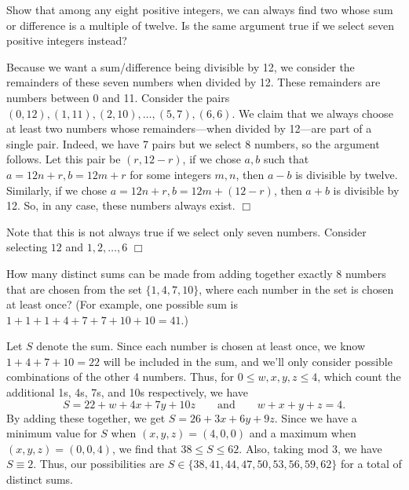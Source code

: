 \begin{problem}
    Show that among any eight positive integers, we can always find two whose sum or difference is a multiple of twelve. Is the same argument true if we select seven positive integers instead?
\end{problem}

\begin{solution}
    Because we want a sum/difference being divisible by 12, we consider the remainders of these seven numbers when divided by 12. These remainders are numbers between 0 and 11. Consider the pairs $(0,12), (1,11), (2,10), \ldots, (5,7), (6,6)$. We claim that we always choose at least two numbers whose remainders---when divided by 12---are part of a single pair. Indeed, we have 7 pairs but we select 8 numbers, so the argument follows. Let this pair be $(r, 12 - r)$, if we chose $a,b$ such that $a = 12n+r, b=12m+r$ for some integers $m,n$, then $a-b$ is divisible by twelve. Similarly, if we chose $a=12n + r, b = 12m + (12-r)$, then $a+b$ is divisible by 12. So, in any case, these numbers always exist. $\Box$

    Note that this is not always true if we select only seven numbers. Consider selecting $12$ and $1,2, \ldots, 6$ $\Box$
\end{solution}

\begin{problem}
    How many distinct sums can be made from adding together exactly 8 numbers that are chosen from the set $\{1,4,7,10\}$, where each number in the set is chosen at least once? (For example, one possible sum is $1 + 1 + 1 + 4 + 7 + 7 + 10 + 10 = 41$.)
\end{problem}

\begin{solution}
        Let $S$ denote the sum. Since each number is chosen at least once, we know $1+4+7+10=22$ will be included in the sum, and we'll only consider possible combinations of the other 4 numbers. Thus, for $0 \leq w,x,y,z \leq 4$, which count the additional 1s, 4s, 7s, and 10s respectively, we have
        \[
            S=22+w+4x+7y+10z \qquad \text{and} \qquad w+x+y+z=4.
        \]
        By adding these together, we get $S=26+3x+6y+9z$. Since we have a minimum value for $S$ when $(x,y,z)=(4,0,0)$ and a maximum when $(x,y,z)=(0,0,4)$, we find that $38 \leq S \leq 62$. Also, taking mod 3, we have $S\equiv2$. Thus, our possibilities are $S\in\{38, 41, 44, 47, 50, 53, 56, 59, 62\}$ for a total of  distinct sums.         
\end{solution}

